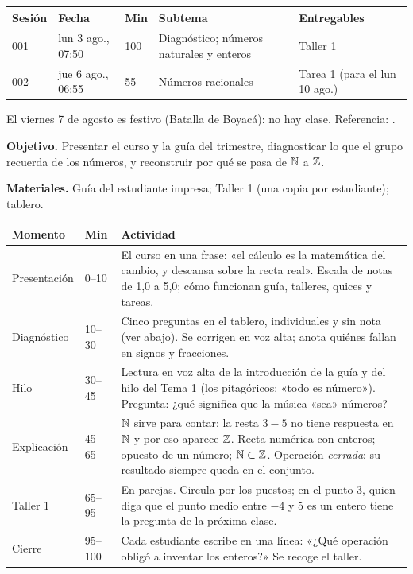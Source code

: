 \documentclass[11pt]{article}
\begin{document}
\encabezado*

\begin{center}
{\renewcommand{\arraystretch}{1.3}
\begin{tabularx}{\linewidth}{@{}l l l X l@{}}
  \toprule
  \textbf{Sesión} & \textbf{Fecha} & \textbf{Min} & \textbf{Subtema} & \textbf{Entregables}\\
  \midrule
  001 & lun 3 ago., 07:50 & 100 & Diagnóstico; números naturales y enteros & Taller 1\\
  002 & jue 6 ago., 06:55 & 55  & Números racionales & Tarea 1 (para el lun 10 ago.)\\
  \bottomrule
\end{tabularx}}
\end{center}

\small El viernes 7 de agosto es festivo (Batalla de Boyacá): no hay clase. \normalsize
Referencia: .


\textbf{Objetivo.} Presentar el curso y la guía del trimestre, diagnosticar lo que el grupo
recuerda de los números, y reconstruir por qué se pasa de $\mathbb{N}$ a $\mathbb{Z}$.

\textbf{Materiales.} Guía del estudiante impresa; Taller 1 (una copia por estudiante); tablero.

\begin{center}
{\renewcommand{\arraystretch}{1.3}
\begin{tabularx}{\linewidth}{@{}l l X@{}}
  \toprule
  \textbf{Momento} & \textbf{Min} & \textbf{Actividad}\\
  \midrule
  Presentación & 0–10 & El curso en una frase: «el cálculo es la matemática del cambio,
    y descansa sobre la recta real». Escala de notas de 1,0 a 5,0; cómo funcionan
    guía, talleres, quices y tareas.\\
  Diagnóstico & 10–30 & Cinco preguntas en el tablero, individuales y sin nota (ver abajo).
    Se corrigen en voz alta; anota quiénes fallan en signos y fracciones.\\
  Hilo & 30–45 & Lectura en voz alta de la introducción de la guía y del hilo del Tema 1
    (los pitagóricos: «todo es número»). Pregunta: ¿qué significa que la música
    «sea» números?\\
  Explicación & 45–65 & $\mathbb{N}$ sirve para contar; la resta $3 - 5$ no tiene respuesta en $\mathbb{N}$
    y por eso aparece $\mathbb{Z}$. Recta numérica con enteros; opuesto de un número;
    $\mathbb{N} \subset \mathbb{Z}$. Operación \emph{cerrada}: su resultado siempre queda en el conjunto.\\
  Taller 1 & 65–95 & En parejas. Circula por los puestos; en el punto 3, quien diga que el
    punto medio entre $-4$ y $5$ es un entero tiene la pregunta de la próxima clase.\\
  Cierre & 95–100 & Cada estudiante escribe en una línea: «¿Qué operación obligó a inventar
    los enteros?» Se recoge el taller.\\
  \bottomrule
\end{tabularx}}
\end{center}
\end{document}
